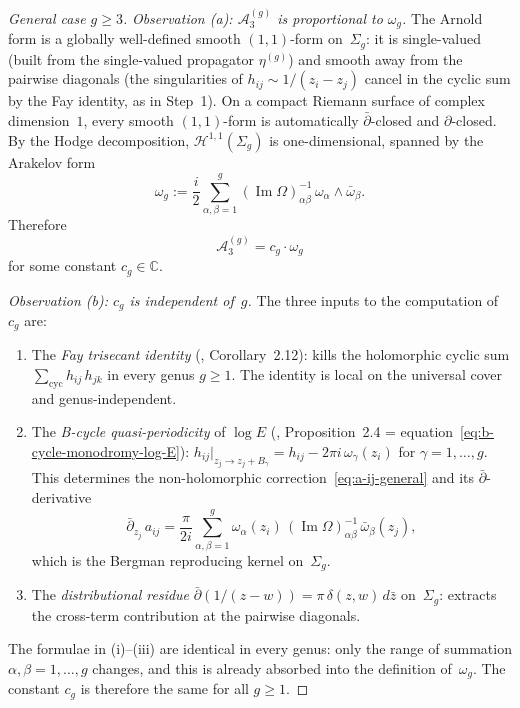 \begin{proof}[General case $g \geq 3$]
\emph{Observation (a): $\mathcal{A}_3^{(g)}$ is proportional
to $\omega_g$.}
The Arnold form is a globally well-defined smooth
$(1,1)$-form on~$\Sigma_g$: it is single-valued
(built from the single-valued propagator $\eta^{(g)}$)
and smooth away from the pairwise diagonals
(the singularities of $h_{ij} \sim 1/(z_i - z_j)$
cancel in the cyclic sum by the Fay identity, as in
Step~1). On a compact Riemann surface of complex
dimension~$1$, every smooth $(1,1)$-form is
automatically $\bar\partial$-closed and $\partial$-closed.
By the Hodge decomposition, $\mathcal{H}^{1,1}(\Sigma_g)$
is one-dimensional, spanned by the Arakelov form
\begin{equation}\label{eq:arakelov-general}
\omega_g
:= \frac{i}{2}\sum_{\alpha,\beta=1}^{g}
 (\operatorname{Im}\Omega)^{-1}_{\alpha\beta}\,
 \omega_\alpha \wedge \bar\omega_\beta.
\end{equation}
Therefore
\begin{equation}\label{eq:A3-proportional}
\mathcal{A}_3^{(g)} = c_g \cdot \omega_g
\end{equation}
for some constant $c_g \in \mathbb{C}$.

\emph{Observation (b): $c_g$ is independent of~$g$.}
The three inputs to the computation of~$c_g$ are:
\begin{enumerate}
\item[\textup{(i)}] The \emph{Fay trisecant identity}
 (\cite{Fay73}, Corollary~2.12): kills the holomorphic
 cyclic sum $\sum_{\mathrm{cyc}} h_{ij}\,h_{jk}$ in
 every genus $g \geq 1$. The identity is local on the
 universal cover and genus-independent.
\item[\textup{(ii)}] The \emph{B-cycle quasi-periodicity}
 of $\log E$ (\cite{Fay73}, Proposition~2.4 =
 equation~\eqref{eq:b-cycle-monodromy-log-E}):
 $h_{ij}\big|_{z_j \to z_j + B_\gamma}
 = h_{ij} - 2\pi i\,\omega_\gamma(z_i)$
 for $\gamma = 1,\ldots,g$.
 This determines the non-holomorphic
 correction~\eqref{eq:a-ij-general} and its
 $\bar\partial$-derivative
 \begin{equation}\label{eq:dbar-a-general}
 \bar\partial_{z_j}\, a_{ij}
 = \frac{\pi}{2i} \sum_{\alpha,\beta=1}^{g}
 \omega_\alpha(z_i)\,
 (\operatorname{Im}\Omega)^{-1}_{\alpha\beta}\,
 \bar\omega_\beta(z_j),
 \end{equation}
 which is the Bergman reproducing kernel on~$\Sigma_g$.
\item[\textup{(iii)}] The \emph{distributional residue}
 $\bar\partial(1/(z-w)) = \pi\,\delta(z,w)\,d\bar{z}$
 on~$\Sigma_g$: extracts the cross-term contribution at
 the pairwise diagonals.
\end{enumerate}
The formulae in (i)--(iii) are identical in every genus:
only the range of summation $\alpha,\beta = 1,\ldots,g$
changes, and this is already absorbed into the definition
of~$\omega_g$. The constant $c_g$ is therefore the same
for all $g \geq 1$.


\end{proof}

